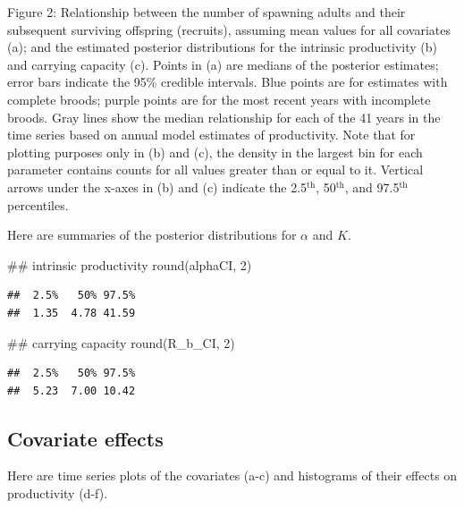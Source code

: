 \documentclass[
  11pt,
]{article}
\newenvironment{Shaded}{}{}
\newcommand{\CommentTok}[1]{\textcolor[rgb]{0.00,0.50,0.00}{#1}}
\newcommand{\DecValTok}[1]{#1}
\newcommand{\KeywordTok}[1]{\textcolor[rgb]{0.00,0.00,1.00}{#1}}
\newcommand{\NormalTok}[1]{#1}
\begin{document}
Figure 2: Relationship between the number of spawning adults and their
subsequent surviving offspring (recruits), assuming mean values for all
covariates (a); and the estimated posterior distributions for the
intrinsic productivity (b) and carrying capacity (c). Points in (a) are
medians of the posterior estimates; error bars indicate the 95\%
credible intervals. Blue points are for estimates with complete broods;
purple points are for the most recent years with incomplete broods. Gray
lines show the median relationship for each of the 41 years in the time
series based on annual model estimates of productivity. Note that for
plotting purposes only in (b) and (c), the density in the largest bin
for each parameter contains counts for all values greater than or equal
to it. Vertical arrows under the x-axes in (b) and (c) indicate the
2.5\(^\text{th}\), 50\(^\text{th}\), and 97.5\(^\text{th}\) percentiles.

Here are summaries of the posterior distributions for \(\alpha\) and
\(K\).

\begin{Shaded}
\begin{Highlighting}[]
\CommentTok{## intrinsic productivity}
\KeywordTok{round}\NormalTok{(alphaCI, }\DecValTok{2}\NormalTok{)}
\end{Highlighting}
\end{Shaded}

\begin{verbatim}
##  2.5%   50% 97.5% 
##  1.35  4.78 41.59
\end{verbatim}

\begin{Shaded}
\begin{Highlighting}[]
\CommentTok{## carrying capacity}
\KeywordTok{round}\NormalTok{(R_b_CI, }\DecValTok{2}\NormalTok{)}
\end{Highlighting}
\end{Shaded}

\begin{verbatim}
##  2.5%   50% 97.5% 
##  5.23  7.00 10.42
\end{verbatim}

\hypertarget{covariate-effects}{%
\subsection{Covariate effects}\label{covariate-effects}}

Here are time series plots of the covariates (a-c) and histograms of
their effects on productivity (d-f).
\end{document}
